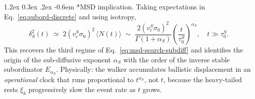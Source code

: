 \documentclass[11pt,a4paper]{article}
\makeatletter
\renewcommand\paragraph{\@startsection{paragraph}{4}{\z@}%
  {1.2ex \@plus 0.3ex \@minus .2ex}%
  {-0.6em}%
  {\normalfont\normalsize\itshape}}
\makeatother
\begin{document}
\paragraph*{MSD implication.}
Taking expectations in Eq.~\eqref{eq:subord-discrete} and using
isotropy,
\begin{equation}
\delta^2_S(t)
\;\simeq\; 2(v_c^S\sigma_0)^2\,\langle N(t)\rangle
\;\sim\; \frac{2(v_c^S\sigma_0)^2}{\Gamma(1+\alpha_S)}
        \left(\frac{t}{\tau_0^S}\right)^{\alpha_S},
\quad t\gg\tau_0^S.
\label{eq:msd-subord}
\end{equation}
This recovers the third regime of
Eq.~\eqref{eq:msd-search-subdiff} and identifies the origin of
the sub-diffusive exponent $\alpha_S$ with the order of the
inverse stable subordinator $E_{\alpha_S}$. Physically: the
walker accumulates ballistic displacement in an \emph{operational}
clock that runs proportional to $t^{\alpha_S}$, not $t$, because
the heavy-tailed rests $\xi_k$ progressively slow the event rate
as $t$ grows.



\end{document}

